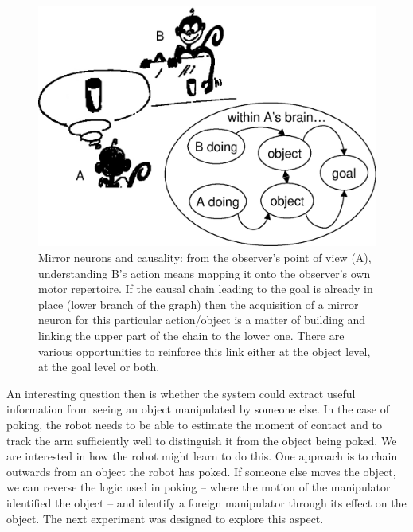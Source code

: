 \ifverbose
\begin{figure}[tb]
\begin{center}
\includegraphics[width=\columnwidth]{mirror-monkey.eps}
\caption{ 
\label{fig:mirror-monkey}
%
Mirror neurons and causality: from the observer's point
of view (A), understanding B's action means mapping it onto the
observer's own
motor repertoire. If the causal chain leading to the goal is already
in place (lower branch of the graph) then the acquisition of a
mirror neuron for this particular action/object is a matter of
building and linking the upper part of the chain to the lower one.
There are various opportunities to reinforce this link either at the object
level, at the goal level or both. 
%
}
\end{center}
\end{figure}
\fi

An interesting question then is
whether the system could extract useful information from seeing an
object manipulated by someone else.  In the case of poking, the robot
needs to be able to estimate the moment of contact and to track the arm
sufficiently well to distinguish it from the object being poked.  We
are interested in how the robot might learn to do this.  One approach
is to chain outwards from an object the robot has poked.  If someone
else moves the object, we can reverse the logic used in poking --
where the motion of the manipulator identified the object -- and
identify a foreign manipulator through its effect on the object.
The next experiment was designed to explore this aspect.

